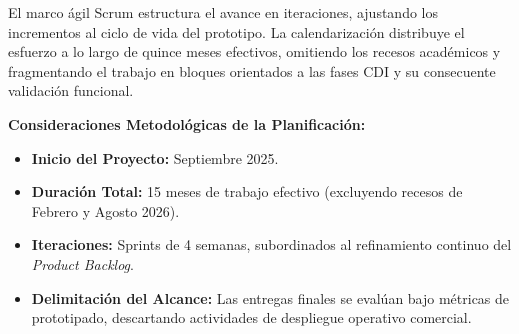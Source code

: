 El marco ágil Scrum estructura el avance en iteraciones, ajustando los incrementos al ciclo de vida del prototipo. La calendarización distribuye el esfuerzo a lo largo de quince meses efectivos, omitiendo los recesos académicos y fragmentando el trabajo en bloques orientados a las fases CDI y su consecuente validación funcional.

\noindent\textbf{Consideraciones Metodológicas de la Planificación:}
\begin{itemize}
	\item \textbf{Inicio del Proyecto:} Septiembre 2025.
	\item \textbf{Duración Total:} 15 meses de trabajo efectivo (excluyendo recesos de Febrero y Agosto 2026).
	\item \textbf{Iteraciones:} Sprints de 4 semanas, subordinados al refinamiento continuo del \textit{Product Backlog}.
	\item \textbf{Delimitación del Alcance:} Las entregas finales se evalúan bajo métricas de prototipado, descartando actividades de despliegue operativo comercial.
\end{itemize}

